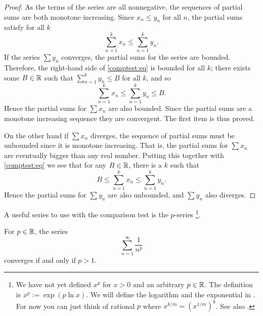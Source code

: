 \begin{proof}
As the terms of the series are all nonnegative, the sequences of
partial sums are both monotone increasing.
Since $x_n \leq y_n$ for all $n$, the partial sums
satisfy for all $k$
\begin{equation} \label{comptest:eq}
\sum_{n=1}^k x_n \leq \sum_{n=1}^k y_n .
\end{equation}
If the series $\sum y_n$ converges, the partial sums for the series
are bounded.  Therefore, the right-hand side of \eqref{comptest:eq}
is bounded for all $k$; there exists some $B \in {\mathbb{R}}$ such that
$\sum_{n=1}^k y_n \leq B$ for all $k$, and so
\begin{equation*}
\sum_{n=1}^k x_n \leq \sum_{n=1}^k y_n \leq B.
\end{equation*}
Hence the partial sums for $\sum x_n$
are also bounded.  Since the partial sums are a monotone increasing sequence
they are convergent.  The first item is thus proved.

On the other hand if $\sum x_n$ diverges, the sequence of partial sums
must be unbounded since it is monotone increasing.  That is, the partial
sums for $\sum x_n$ are eventually bigger than any real number.  Putting this
together with \eqref{comptest:eq} we see that for any $B \in
{\mathbb{R}}$, there is a $k$ such that 
\begin{equation*}
B \leq \sum_{n=1}^k x_n \leq \sum_{n=1}^k y_n .
\end{equation*}
Hence the partial sums for $\sum y_n$ are also unbounded, and $\sum
y_n$ also diverges.
\end{proof}

A useful series to use with the comparison test is the
$p$-series%
\footnote{We have not yet defined $x^p$ for $x > 0$ and
an arbitrary $p \in {\mathbb{R}}$.  The definition is $x^p := \exp ( p \ln x )$.
We will define the logarithm and the exponential in .
For now you can just think of rational $p$
where $x^{k/m} = {(x^{1/m})}^{k}$.  See also .}.

\begin{prop}%
For $p \in {\mathbb{R}}$, 
the series
\begin{equation*}
\sum_{n=1}^\infty \frac{1}{n^p}
\end{equation*}
converges if and only if $p > 1$.
\end{prop}

